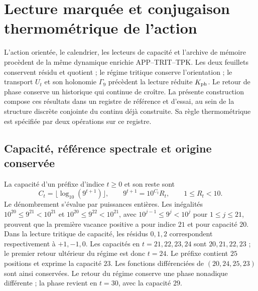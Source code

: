 \section{Lecture marquée et conjugaison thermométrique de l'action}
\label{md:r27:termica}

L'action orientée, le calendrier, les lecteurs de capacité et l'archive de mémoire procèdent de la même dynamique enrichie APP--TRIT--TPK. Les deux feuillets conservent résidu et quotient ; le régime tritique conserve l'orientation ; le transport $U_t$ et son holonomie $\Gamma_9$ précèdent la lecture réduite $K_{\rm ph}$. Le retour de phase conserve un historique qui continue de croître. La présente construction compose ces résultats dans un registre de référence et d'essai, au sein de la structure discrète conjointe du continu déjà construite. Sa règle thermométrique est spécifiée par deux opérations sur ce registre.

\subsection{Capacité, référence spectrale et origine conservée}
\label{md:r27:capacidad}
La capacité d'un préfixe d'indice $t\ge0$ et son reste sont
\begin{equation}
 C_t=\lfloor\log_{10}(9^{t+1})\rfloor,\qquad
 9^{t+1}=10^{C_t}R_t,\qquad 1\le R_t<10.
 \label{md:r27:capacidad-resto}
\end{equation}
Le dénombrement s'évalue par puissances entières. Les inégalités $10^{20}\le9^{21}<10^{21}$ et $10^{20}\le9^{22}<10^{21}$, avec $10^{j-1}\le9^j<10^j$ pour $1\le j\le21$, prouvent que la première vacance positive a pour indice $21$ et pour capacité $20$. Dans la lecture tritique de capacité, les résidus $0,1,2$ correspondent respectivement à $+1,-1,0$. Les capacités en $t=21,22,23,24$ sont $20,21,22,23$ ; le premier retour ultérieur du régime est donc $t=24$. Le préfixe contient $25$ positions et exprime la capacité $23$. Les fonctions différenciées de $(20,24,25,23)$ sont ainsi conservées. Le retour du régime conserve une phase nonadique différente ; la phase revient en $t=30$, avec la capacité $29$.

